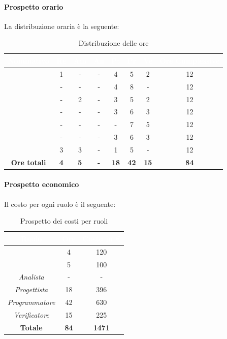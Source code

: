 \paragraph*{Prospetto orario}
La distribuzione oraria è la seguente:
\begin{table}[H]
	\begin{center}
		\begin{tabular}{ |c c c c c c c c| }
			\rowcolor{darkblue} 
			\textcolor{white}{\textbf{Nominativo}} & \textcolor{white}{\textbf{Re}} & \textcolor{white}{\textbf{Am}} & \textcolor{white}{\textbf{An}} & \textcolor{white}{\textbf{Pt}} & \textcolor{white}{\textbf{Pr}} & \textcolor{white}{\textbf{Ve}} & \textcolor{white}{\textbf{Ore Complessive}} \\ \hline
				\BL 	& 1  	& -  	& - 	& 4 	& 5 	& 2 	& 12 \\ \hline
			\FF 	& -  	& -  	& - 	& 4 	& 8 	& -  	& 12 \\ \hline
			\MM 	& -  	& 2  	& - 	& 3 	& 5 	& 2 	& 12 \\ \hline
			\PC 	& - 	& -  	& - 	& 3 	& 6 	& 3 	& 12 \\ \hline
			\TG 	& -  	& -		& - 	& - 	& 7 	& 5 	& 12 \\ \hline
			\TL 	& -  	& - 	& - 	& 3 	& 6 	& 3 	& 12 \\ \hline
			\VD 	& 3  	& 3  	& - 	& 1 	& 5 	& -	& 12 \\ \hline
			\textbf{Ore totali} & \textbf{4} & \textbf{5} & \textbf{-} & \textbf{18} & \textbf{42} & \textbf{15} & \textbf{84} \\ \hline
		\end{tabular}
		\caption{Distribuzione delle ore}
	\end{center}
\end{table}
\paragraph*{Prospetto economico}
Il costo per ogni ruolo è il seguente:
\begin{table}[H]
	\begin{center}
		\begin{tabular}{ |c c c| }
			\rowcolor{darkblue} 
			\textcolor{white}{\textbf{Ruolo}} & \textcolor{white}{\textbf{Ore}} & \textcolor{white}{\textbf{Costo in €}}\\ \hline
		{\Responsabile} 			& 4 	& 120 \\ \hline
		{\Amministratore}		 	& 5 	& 100 \\ \hline
		\textit{Analista} 			& - 	& - \\ \hline
		\textit{Progettista} 		& 18 	& 396 \\ \hline
		\textit{Programmatore}  	& 42 	& 630 \\ \hline
		\textit{Verificatore} 		& 15 	& 225 \\ \hline
		\textbf{Totale} & \textbf{84} & \textbf{1471} \\ \hline
		\end{tabular}
		\caption{Prospetto dei costi per ruoli}
	\end{center}
\end{table}

